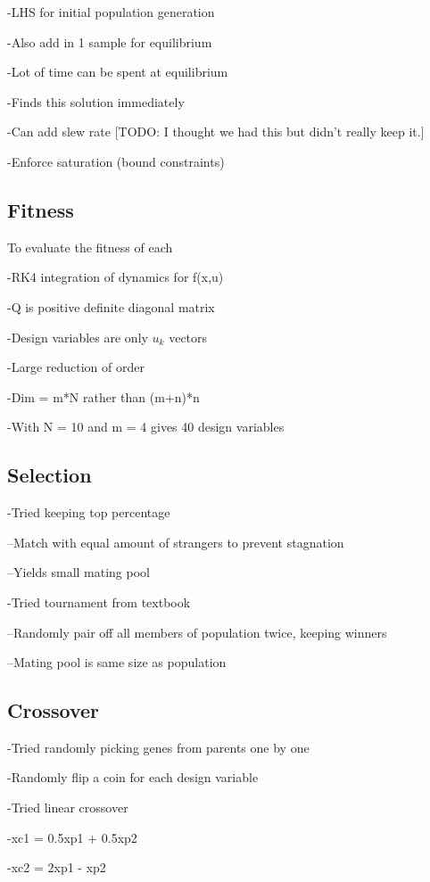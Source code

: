 \documentclass[letterpaper, 10 pt, conference]{ieeeconf}  %
\newcommand{\todo}[1]{{\color{blue}[TODO: #1]}}
\begin{document}
-LHS for initial population generation

-Also add in 1 sample for equilibrium

-Lot of time can be spent at equilibrium

-Finds this solution immediately

-Can add slew rate \todo{I thought we had this but didn't really keep it.}

-Enforce saturation (bound constraints)


\subsection{Fitness}

To evaluate the fitness of each 

-RK4 integration of dynamics for f(x,u)

-Q is positive definite diagonal matrix

-Design variables are only $u_k$ vectors

-Large reduction of order

-Dim = m*N rather than (m+n)*n

-With N = 10 and m = 4 gives 40 design variables




\subsection{Selection}

-Tried keeping top percentage

--Match with equal amount of strangers to prevent stagnation

--Yields small mating pool

-Tried tournament from textbook

--Randomly pair off all members of population twice, keeping winners

--Mating pool is same size as population


\subsection{Crossover}

-Tried randomly picking genes from parents one by one

-Randomly flip a coin for each design variable

-Tried linear crossover

-xc1 = 0.5xp1 + 0.5xp2

-xc2 = 2xp1 - xp2
\end{document}
